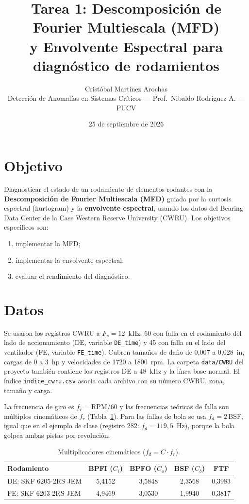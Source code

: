 \documentclass[11pt,a4paper]{article}
\title{\textbf{Tarea 1: Descomposición de Fourier Multiescala (MFD)\\ y Envolvente Espectral para diagnóstico de rodamientos}}
\author{Cristóbal Martínez Arochas\\ \small Detección de Anomalías en Sistemas Críticos --- Prof.\ Nibaldo Rodríguez A. --- PUCV}
\date{25 de septiembre de 2026}
\begin{document}
\maketitle

\section{Objetivo}
Diagnosticar el estado de un rodamiento de elementos rodantes con la \textbf{Descomposición de Fourier Multiescala (MFD)} guiada por la curtosis espectral (kurtogram) y la \textbf{envolvente espectral}, usando los datos del Bearing Data Center de la Case Western Reserve University (CWRU). Los objetivos específicos son:
\begin{enumerate}[itemsep=1pt]
\item implementar la MFD;
\item implementar la envolvente espectral;
\item evaluar el rendimiento del diagnóstico.
\end{enumerate}

\section{Datos}
Se usaron los registros CWRU a $F_s=12$~kHz: 60 con falla en el rodamiento del lado de accionamiento (DE, variable \texttt{DE\_time}) y 45 con falla en el lado del ventilador (FE, variable \texttt{FE\_time}). Cubren tamaños de daño de 0{,}007 a 0{,}028~in, cargas de 0 a 3~hp y velocidades de 1720 a 1800~rpm. La carpeta \texttt{data/CWRU} del proyecto también contiene los registros DE a 48~kHz y la línea base normal. El índice \texttt{indice\_cwru.csv} asocia cada archivo con su número CWRU, zona, tamaño y carga.

La frecuencia de giro es $f_r=\mathrm{RPM}/60$ y las frecuencias teóricas de falla son múltiplos cinemáticos de $f_r$ (Tabla~\ref{tab:mult}). Para las fallas de bola se usa $f_d=2\,\mathrm{BSF}$, igual que en el ejemplo de clase (registro 282: $f_d=119{,}5$~Hz), porque la bola golpea ambas pistas por revolución.

\begin{table}[h]
\centering\small
\begin{tabular}{@{}lcccc@{}}
\toprule
Rodamiento & BPFI ($C_i$) & BPFO ($C_o$) & BSF ($C_b$) & FTF\\
\midrule
DE: SKF 6205-2RS JEM & 5{,}4152 & 3{,}5848 & 2{,}3568 & 0{,}3983\\
FE: SKF 6203-2RS JEM & 4{,}9469 & 3{,}0530 & 1{,}9940 & 0{,}3817\\
\bottomrule
\end{tabular}
\caption{Multiplicadores cinemáticos ($f_d=C\cdot f_r$).}
\label{tab:mult}
\end{table}
\end{document}
